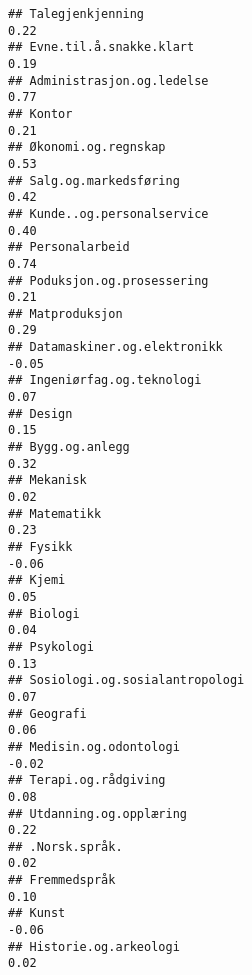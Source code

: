 \documentclass[
]{article}
\begin{document}
\begin{verbatim}
## Talegjenkjenning                                                                  0.22
## Evne.til.å.snakke.klart                                                           0.19
## Administrasjon.og.ledelse                                                         0.77
## Kontor                                                                            0.21
## Økonomi.og.regnskap                                                               0.53
## Salg.og.markedsføring                                                             0.42
## Kunde..og.personalservice                                                         0.40
## Personalarbeid                                                                    0.74
## Poduksjon.og.prosessering                                                         0.21
## Matproduksjon                                                                     0.29
## Datamaskiner.og.elektronikk                                                      -0.05
## Ingeniørfag.og.teknologi                                                          0.07
## Design                                                                            0.15
## Bygg.og.anlegg                                                                    0.32
## Mekanisk                                                                          0.02
## Matematikk                                                                        0.23
## Fysikk                                                                           -0.06
## Kjemi                                                                             0.05
## Biologi                                                                           0.04
## Psykologi                                                                         0.13
## Sosiologi.og.sosialantropologi                                                    0.07
## Geografi                                                                          0.06
## Medisin.og.odontologi                                                            -0.02
## Terapi.og.rådgiving                                                               0.08
## Utdanning.og.opplæring                                                            0.22
## .Norsk.språk.                                                                     0.02
## Fremmedspråk                                                                      0.10
## Kunst                                                                            -0.06
## Historie.og.arkeologi                                                             0.02

\end{verbatim}
\end{document}
